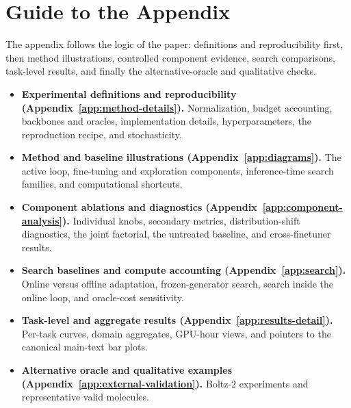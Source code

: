 \documentclass{article}
\begin{document}
\section*{Guide to the Appendix}
The appendix follows the logic of the paper: definitions and reproducibility first, then method illustrations, controlled component evidence, search comparisons, task-level results, and finally the alternative-oracle and qualitative checks.
\begin{itemize}
\item \textbf{Experimental definitions and reproducibility (Appendix~\ref{app:method-details}).} Normalization, budget accounting, backbones and oracles, implementation details, hyperparameters, the reproduction recipe, and stochasticity.
\item \textbf{Method and baseline illustrations (Appendix~\ref{app:diagrams}).} The active loop, fine-tuning and exploration components, inference-time search families, and computational shortcuts.
\item \textbf{Component ablations and diagnostics (Appendix~\ref{app:component-analysis}).} Individual knobs, secondary metrics, distribution-shift diagnostics, the joint factorial, the untreated baseline, and cross-finetuner results.
\item \textbf{Search baselines and compute accounting (Appendix~\ref{app:search}).} Online versus offline adaptation, frozen-generator search, search inside the online loop, and oracle-cost sensitivity.
\item \textbf{Task-level and aggregate results (Appendix~\ref{app:results-detail}).} Per-task curves, domain aggregates, GPU-hour views, and pointers to the canonical main-text bar plots.
\item \textbf{Alternative oracle and qualitative examples (Appendix~\ref{app:external-validation}).} Boltz-2 experiments and representative valid molecules.
\end{itemize}
\end{document}
